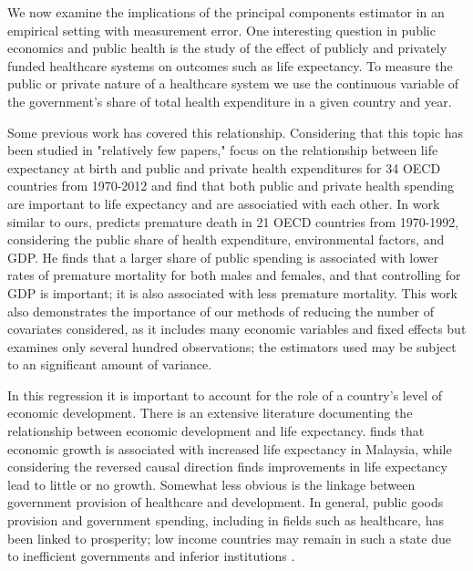 \documentclass[10pt]{article}
\begin{document}
        We now examine the implications of the principal components estimator in an empirical setting with measurement error. One interesting question in public economics and public health is the study of the effect of publicly and privately funded healthcare systems on outcomes such as life expectancy. To measure the public or private nature of a healthcare system we use the continuous variable of the government's share of total health expenditure in a given country and year.

        Some previous work has covered this relationship. Considering that this topic has been studied in "relatively few papers," \cite{linden_life_2017} focus on the relationship between life expectancy at birth and public and private health expenditures for 34 OECD countries from 1970-2012 and find that both public and private health spending are important to life expectancy and are associatied with each other. In work similar to ours, \cite{or_determinants_2000} predicts premature death in 21 OECD countries from 1970-1992, considering the public share of health expenditure, environmental factors, and GDP. He finds that a larger share of public spending is associated with lower rates of premature mortality for both males and females, and that controlling for GDP is important; it is also associated with less premature mortality. This work also demonstrates the importance of our methods of reducing the number of covariates considered, as it includes many economic variables and fixed effects but examines only several hundred observations; the estimators used may be subject to an significant amount of variance.

        In this regression it is important to account for the role of a country's level of economic development. There is an extensive literature documenting the relationship between economic development and life expectancy. \cite{ling_testing_2017} finds that economic growth is associated with increased life expectancy in Malaysia, while considering the reversed causal direction \cite{acemoglu_disease_2007} finds improvements in life expectancy lead to little or no growth. Somewhat less obvious is the linkage between government provision of healthcare and development. In general, public goods provision and government spending, including in fields such as healthcare, has been linked to prosperity; low income countries may remain in such a state due to inefficient governments and inferior institutions \citep{wu_impact_2010}.
\end{document}
